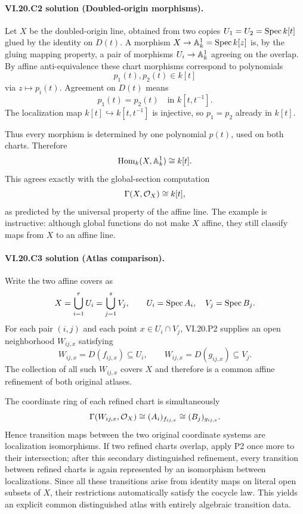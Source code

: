 \paragraph{VI.20.C2 solution (Doubled-origin morphisms).}
\begin{solution}
Let $X$ be the doubled-origin line, obtained from two copies $U_1=U_2=\operatorname{Spec} k[t]$ glued by the identity on $D(t)$.  A morphism $X\to\mathbb A^1_k=\operatorname{Spec} k[z]$ is, by the gluing mapping property, a pair of morphisms $U_i\to\mathbb A^1_k$ agreeing on the overlap.  By affine anti-equivalence these chart morphisms correspond to polynomials
\[
p_1(t),p_2(t)\in k[t]
\]
via $z\mapsto p_i(t)$.  Agreement on $D(t)$ means
\[
p_1(t)=p_2(t)\quad\text{in }k[t,t^{-1}].
\]
The localization map $k[t]\hookrightarrow k[t,t^{-1}]$ is injective, so $p_1=p_2$ already in $k[t]$.

Thus every morphism is determined by one polynomial $p(t)$, used on both charts.  Therefore
\[
\operatorname{Hom}_k(X,\mathbb A^1_k)\cong k[t].
\]
This agrees exactly with the global-section computation
\[
\Gamma(X,\mathcal O_X)\cong k[t],
\]
as predicted by the universal property of the affine line.  The example is instructive: although global functions do not make $X$ affine, they still classify maps from $X$ to an affine line.
\end{solution}

\paragraph{VI.20.C3 solution (Atlas comparison).}
\begin{solution}
Write the two affine covers as
\[
X=\bigcup_{i=1}^r U_i=\bigcup_{j=1}^s V_j,\qquad U_i=\operatorname{Spec} A_i,\quad V_j=\operatorname{Spec} B_j.
\]
For each pair $(i,j)$ and each point $x\in U_i\cap V_j$, VI.20.P2 supplies an open neighborhood $W_{ij,x}$ satisfying
\[
W_{ij,x}=D(f_{ij,x})\subseteq U_i,
\qquad
W_{ij,x}=D(g_{ij,x})\subseteq V_j.
\]
The collection of all such $W_{ij,x}$ covers $X$ and therefore is a common affine refinement of both original atlases.

The coordinate ring of each refined chart is simultaneously
\[
\Gamma(W_{ij,x},\mathcal O_X)
\cong(A_i)_{f_{ij,x}}
\cong(B_j)_{g_{ij,x}}.
\]
Hence transition maps between the two original coordinate systems are localization isomorphisms.  If two refined charts overlap, apply P2 once more to their intersection; after this secondary distinguished refinement, every transition between refined charts is again represented by an isomorphism between localizations.  Since all these transitions arise from identity maps on literal open subsets of $X$, their restrictions automatically satisfy the cocycle law.  This yields an explicit common distinguished atlas with entirely algebraic transition data.
\end{solution}

